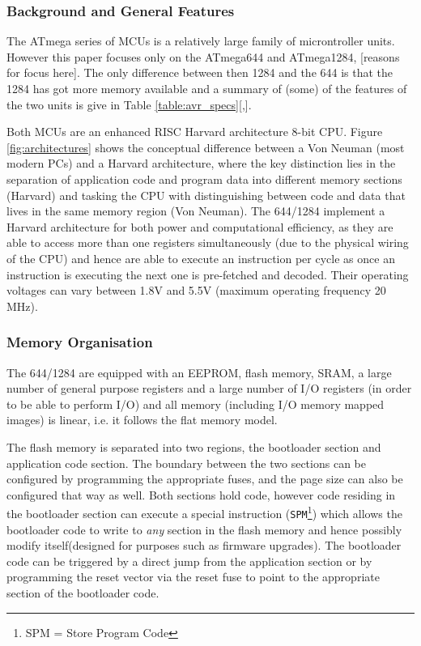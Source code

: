 \documentclass[12pt,a4paper,twocolumn]{article}
\begin{document}
	\subsubsection{Background and General Features}
	The ATmega series of MCUs is a relatively large family of microntroller units. However this paper focuses only on the ATmega644 and ATmega1284, [reasons for focus here]. The only difference between then 1284 and the 644 is that the 1284 has got more memory available and a summary of (some) of the features of the two units is give in Table \ref{table:avr_specs}[\citep{atmega644_manual},\citep{atmega1284_manual}]. 
	
	Both MCUs are an enhanced RISC Harvard architecture 8-bit CPU. Figure \ref{fig:architectures} shows the conceptual difference between a Von Neuman (most modern PCs) and a Harvard architecture, where the key distinction lies in the separation of application code and program data into different memory sections (Harvard) and tasking the CPU with distinguishing between code and data that lives in the same memory region (Von Neuman). The 644/1284 implement a Harvard architecture for both power and computational efficiency, as they are able to access more than one registers simultaneously (due to the physical wiring of the CPU) and hence are able to execute an instruction per cycle as once an instruction is executing the next one is pre-fetched and decoded. Their operating voltages can vary between 1.8V and 5.5V (maximum operating frequency 20 MHz).
	
	\subsubsection{Memory Organisation}
	The 644/1284 are equipped with an EEPROM, flash memory, SRAM, a large number of general purpose registers and a large number of I/O registers (in order to be able to perform I/O) and all memory (including I/O memory mapped images) is linear, i.e. it follows the flat memory model.
	
	The flash memory is separated into two regions, the bootloader section and application code section. The boundary between the two sections can be configured by programming the appropriate fuses, and the page size can also be configured that way as well. Both sections hold code, however code residing in the bootloader section can execute a special instruction (\texttt{SPM}\footnote{SPM = Store Program Code}) which allows the bootloader code to write to \textit{any} section in the flash memory and hence possibly modify itself(designed for purposes such as firmware upgrades). The bootloader code can be triggered by a direct jump from the application section or by programming the reset vector via the reset fuse to point to the appropriate section of the bootloader code. 
	
\end{document}
